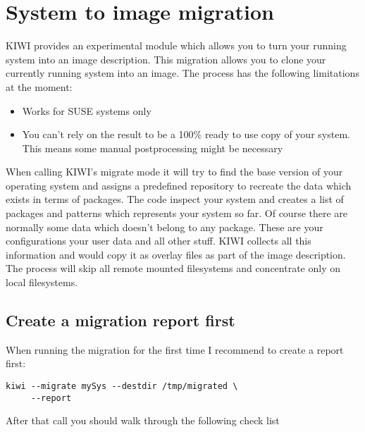 \chapter{System to image migration}
\label{chapter:migration}
\minitoc

KIWI provides an experimental module which allows you to turn your
running system into an image description. This migration allows you
to clone your currently running system into an image. The process
has the following limitations at the moment:

\begin{itemize}
\item Works for SUSE systems only
\item You can't rely on the result to be a 100\% ready to use copy
      of your system. This means some manual postprocessing might
      be necessary
\end{itemize}

When calling KIWI's migrate mode it will try to find the base version
of your operating system and assigns a predefined repository to recreate
the data which exists in terms of packages. The code inspect your
system and creates a list of packages and patterns which represents
your system so far. Of course there are normally some data which
doesn't belong to any package. These are your configurations your user
data and all other stuff. KIWI collects all this information and would
copy it as overlay files as part of the image description. The process
will skip all remote mounted filesystems and concentrate only on local
filesystems.

\section{Create a migration report first}
When running the migration for the first time I
recommend to create a report first:

\begin{Command}{12cm}
\begin{verbatim}
kiwi --migrate mySys --destdir /tmp/migrated \
     --report
\end{verbatim}
\end{Command}

After that call you should walk through the following check list

